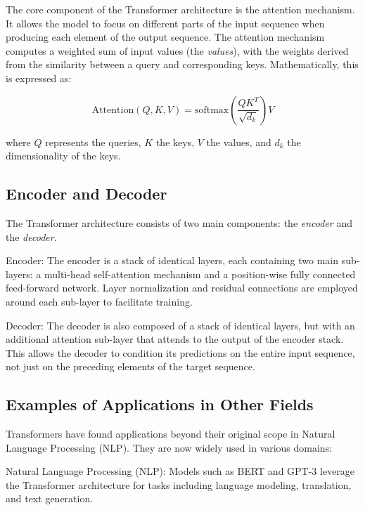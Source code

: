 The core component of the Transformer architecture is the attention mechanism. It allows the model to focus on different parts of the input sequence when producing each element of the output sequence. The attention mechanism computes a weighted sum of input values (the \textit{values}), with the weights derived from the similarity between a query and corresponding keys. Mathematically, this is expressed as:

\begin{equation}
\text{Attention}(Q, K, V) = \text{softmax}\left(\frac{QK^T}{\sqrt{d_k}}\right)V
\end{equation}

where \( Q \) represents the queries, \( K \) the keys, \( V \) the values, and \( d_k \) the dimensionality of the keys.

\subsection{Encoder and Decoder}

The Transformer architecture consists of two main components: the \textit{encoder} and the \textit{decoder}. 

\par{Encoder:} The encoder is a stack of identical layers, each containing two main sub-layers: a multi-head self-attention mechanism and a position-wise fully connected feed-forward network. Layer normalization and residual connections are employed around each sub-layer to facilitate training.

\par{Decoder:} The decoder is also composed of a stack of identical layers, but with an additional attention sub-layer that attends to the output of the encoder stack. This allows the decoder to condition its predictions on the entire input sequence, not just on the preceding elements of the target sequence.

\subsection{Examples of Applications in Other Fields}

Transformers have found applications beyond their original scope in Natural Language Processing (NLP). They are now widely used in various domains:

\par{Natural Language Processing (NLP):} Models such as BERT \cite{devlin2018bert} and GPT-3 \cite{brown2020language} leverage the Transformer architecture for tasks including language modeling, translation, and text generation.

